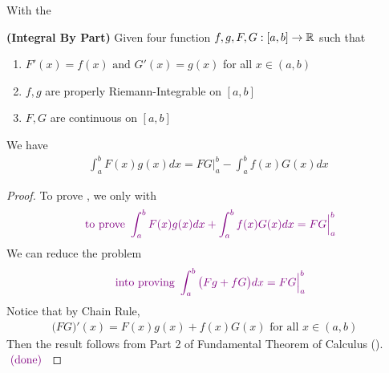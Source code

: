 \documentclass{report}
\begin{document}
\begin{mdframed}
With the  
\end{mdframed}
\begin{theorem}
\textbf{(Integral By Part)} Given four function $f,g,F,G:[a,b]\rightarrow \mathbb{R}$ such that 

\begin{enumerate}[label=(\alph*)]
  \item $F'(x)=f(x)\text{ and }G'(x)=g(x)$ for all $x\in (a,b)$ 
  \item $f,g$ are properly Riemann-Integrable on  $[a,b]$ 
  \item $F,G$ are continuous on  $[a,b]$
\end{enumerate}
We have
\begin{align}
\label{FI}
\int_a^b F(x)g(x)dx=FG\Big|^b_a-\int_a^b f(x)G(x)dx
\end{align}
\end{theorem}
\begin{proof}
To prove , we only with 
\begin{align*}
\textcolor{violet}{\text{ to prove }\int_a^b F(x)g(x)dx+\int_a^b f(x)G(x)dx=FG\Big|_a^b}
\end{align*}
We can reduce the problem 
\begin{align*}
\textcolor{violet}{\text{ into proving }\int_a^b \big( Fg+fG \big) dx=FG\Big|_a^b}
\end{align*}
Notice that by Chain Rule,  
\begin{align*}
\big(FG \big)'(x)=F(x)g(x)+f(x)G(x)\text{ for all $x \in (a,b)$ }
\end{align*}
Then the result follows from Part 2 of Fundamental Theorem of Calculus (). $\textcolor{violet}{\text{ (done) }}$
\end{proof}
\end{document}
